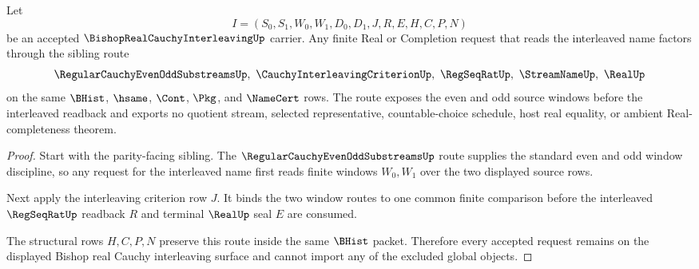 \begin{theorem}
\label{thm:bishop-real-cauchy-interleaving-window-route}
Let
$$
I=(S_0,S_1,W_0,W_1,D_0,D_1,J,R,E,H,C,P,N)
$$
be an accepted $\BishopRealCauchyInterleavingUp$ carrier. Any finite Real or Completion request that reads the interleaved name factors through the sibling route
$$
\RegularCauchyEvenOddSubstreamsUp,\ \CauchyInterleavingCriterionUp,\ \RegSeqRatUp,\ \StreamNameUp,\ \RealUp
$$
on the same $\BHist$, $\hsame$, $\Cont$, $\Pkg$, and $\NameCert$ rows. The route exposes the even and odd source windows before the interleaved readback and exports no quotient stream, selected representative, countable-choice schedule, host real equality, or ambient Real-completeness theorem.
\end{theorem}
\begin{proof}
Start with the parity-facing sibling. The $\RegularCauchyEvenOddSubstreamsUp$ route supplies the standard even and odd window discipline, so any request for the interleaved name first reads finite windows $W_0,W_1$ over the two displayed source rows.

Next apply the interleaving criterion row $J$. It binds the two window routes to one common finite comparison before the interleaved $\RegSeqRatUp$ readback $R$ and terminal $\RealUp$ seal $E$ are consumed.

The structural rows $H,C,P,N$ preserve this route inside the same $\BHist$ packet. Therefore every accepted request remains on the displayed Bishop real Cauchy interleaving surface and cannot import any of the excluded global objects.
\end{proof}



